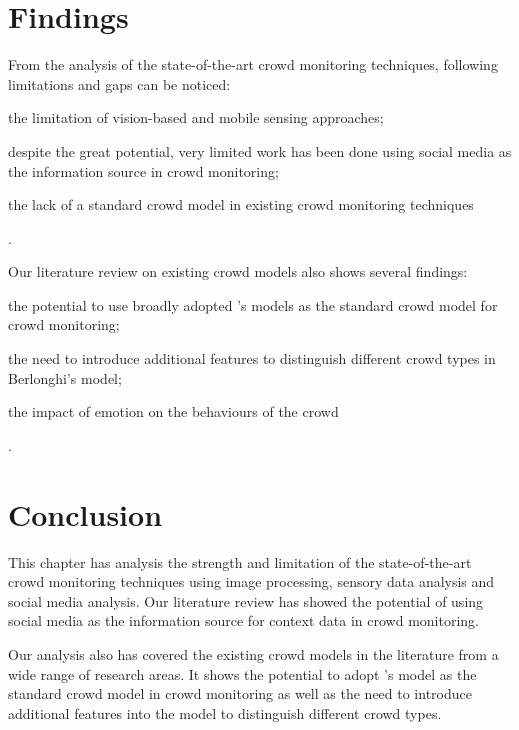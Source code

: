 \section{Findings}
From the analysis of the state-of-the-art crowd monitoring techniques, following limitations and gaps can be noticed:
\begin{inparaenum}[i)]
	\item the limitation of vision-based and mobile sensing approaches;
	\item despite the great potential, very limited work has been done using social media as the information source in crowd monitoring;
	\item the lack of a standard crowd model in existing crowd monitoring techniques
\end{inparaenum}.

Our literature review on existing crowd models also shows several findings:
\begin{inparaenum}[i)]
	\item the potential to use broadly adopted \textcite{Berlonghi1995}'s models as the standard crowd model for crowd monitoring;
	\item the need to introduce additional features to distinguish different crowd types in Berlonghi's model;
	\item the impact of emotion on the behaviours of the crowd
\end{inparaenum}.

\section{Conclusion}
This chapter has analysis the strength and limitation of the state-of-the-art crowd monitoring techniques using image processing, sensory data analysis and social media analysis. Our literature review has showed the potential of using social media as the information source for context data in crowd monitoring.

Our analysis also has covered the existing crowd models in the literature from a wide range of research areas. It shows the potential to adopt \textcite{Berlonghi1995}'s model as the standard crowd model in crowd monitoring as well as the need to introduce additional features into the model to distinguish different crowd types.